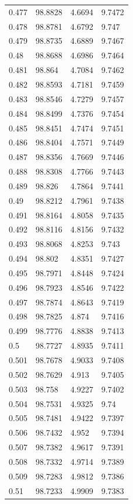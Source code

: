 \begin{tabular}{llll}
0.477 & 98.8828 & 4.6694 & 9.7472 \\
0.478 & 98.8781 & 4.6792 & 9.747 \\
0.479 & 98.8735 & 4.6889 & 9.7467 \\
0.48 & 98.8688 & 4.6986 & 9.7464 \\
0.481 & 98.864 & 4.7084 & 9.7462 \\
0.482 & 98.8593 & 4.7181 & 9.7459 \\
0.483 & 98.8546 & 4.7279 & 9.7457 \\
0.484 & 98.8499 & 4.7376 & 9.7454 \\
0.485 & 98.8451 & 4.7474 & 9.7451 \\
0.486 & 98.8404 & 4.7571 & 9.7449 \\
0.487 & 98.8356 & 4.7669 & 9.7446 \\
0.488 & 98.8308 & 4.7766 & 9.7443 \\
0.489 & 98.826 & 4.7864 & 9.7441 \\
0.49 & 98.8212 & 4.7961 & 9.7438 \\
0.491 & 98.8164 & 4.8058 & 9.7435 \\
0.492 & 98.8116 & 4.8156 & 9.7432 \\
0.493 & 98.8068 & 4.8253 & 9.743 \\
0.494 & 98.802 & 4.8351 & 9.7427 \\
0.495 & 98.7971 & 4.8448 & 9.7424 \\
0.496 & 98.7923 & 4.8546 & 9.7422 \\
0.497 & 98.7874 & 4.8643 & 9.7419 \\
0.498 & 98.7825 & 4.874 & 9.7416 \\
0.499 & 98.7776 & 4.8838 & 9.7413 \\
0.5 & 98.7727 & 4.8935 & 9.7411 \\
0.501 & 98.7678 & 4.9033 & 9.7408 \\
0.502 & 98.7629 & 4.913 & 9.7405 \\
0.503 & 98.758 & 4.9227 & 9.7402 \\
0.504 & 98.7531 & 4.9325 & 9.74 \\
0.505 & 98.7481 & 4.9422 & 9.7397 \\
0.506 & 98.7432 & 4.952 & 9.7394 \\
0.507 & 98.7382 & 4.9617 & 9.7391 \\
0.508 & 98.7332 & 4.9714 & 9.7389 \\
0.509 & 98.7283 & 4.9812 & 9.7386 \\
0.51 & 98.7233 & 4.9909 & 9.7383 \\

\end{tabular}
